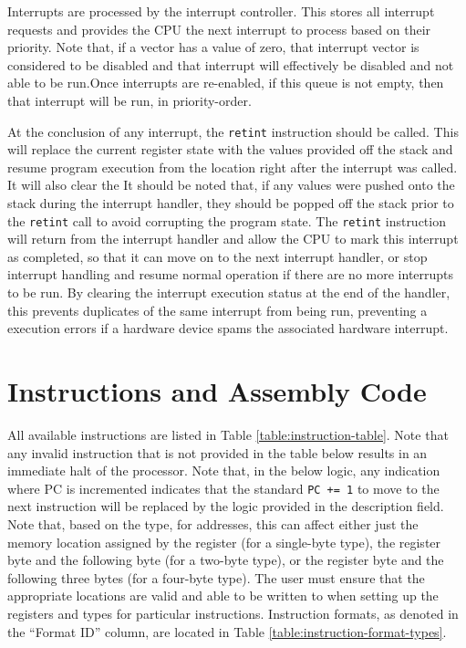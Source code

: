 \documentclass{article}
\begin{document}
Interrupts are processed by the interrupt controller. This stores all interrupt requests and provides the CPU the next interrupt to process based on their priority. Note that, if a vector has a value of zero, that interrupt vector is considered to be disabled and that interrupt will effectively be disabled and not able to be run.Once interrupts are re-enabled, if this queue is not empty, then that interrupt will be run, in priority-order. 

At the conclusion of any interrupt, the \texttt{retint} instruction should be called. This will replace the current register state with the values provided off the stack and resume program execution from the location right after the interrupt was called. It will also clear the It should be noted that, if any values were pushed onto the stack during the interrupt handler, they should be popped off the stack prior to the \texttt{retint} call to avoid corrupting the program state. The \texttt{retint} instruction will return from the interrupt handler and allow the CPU to mark this interrupt as completed, so that it can move on to the next interrupt handler, or stop interrupt handling and resume normal operation if there are no more interrupts to be run. By clearing the interrupt execution status at the end of the handler, this prevents duplicates of the same interrupt from being run, preventing a execution errors if a hardware device spams the associated hardware interrupt.

\pagebreak

\section{Instructions and Assembly Code}
\label{sec:instructions}

All available instructions are listed in Table \ref{table:instruction-table}. Note that any invalid instruction that is not provided in the table below results in an immediate halt of the processor. Note that, in the below logic, any indication where PC is incremented indicates that the standard \texttt{PC += 1} to move to the next instruction will be replaced by the logic provided in the description field. Note that, based on the type, for addresses, this can affect either just the memory location assigned by the register (for a single-byte type), the register byte and the following byte (for a two-byte type), or the register byte and the following three bytes (for a four-byte type). The user must ensure that the appropriate locations are valid and able to be written to when setting up the registers and types for particular instructions. Instruction formats, as denoted in the ``Format ID'' column, are located in Table \ref{table:instruction-format-types}.
\end{document}
